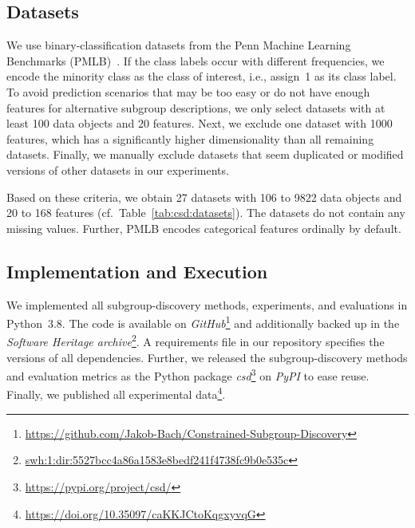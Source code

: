 \documentclass{article}
\theoremstyle{definition}
\begin{document}
\subsection{Datasets}
\label{sec:csd:experimental-design:datasets}

We use binary-classification datasets from the Penn Machine Learning Benchmarks (PMLB)~\cite{olson2017pmlb, romano2021pmlb}.
If the class labels occur with different frequencies, we encode the minority class as the class of interest, i.e., assign~1 as its class label.
To avoid prediction scenarios that may be too easy or do not have enough features for alternative subgroup descriptions, we only select datasets with at least 100 data objects and 20 features.
Next, we exclude one dataset with 1000 features, which has a significantly higher dimensionality than all remaining datasets.
Finally, we manually exclude datasets that seem duplicated or modified versions of other datasets in our experiments.

Based on these criteria, we obtain 27 datasets with 106 to 9822 data objects and 20 to 168 features (cf.~Table~\ref{tab:csd:datasets}).
The datasets do not contain any missing values.
Further, PMLB encodes categorical features ordinally by default.

\subsection{Implementation and Execution}
\label{sec:csd:experimental-design:implementation}

We implemented all subgroup-discovery methods, experiments, and evaluations in Python~3.8.
The code is available on \emph{GitHub}\footnote{\url{https://github.com/Jakob-Bach/Constrained-Subgroup-Discovery}} and additionally backed up in the \emph{Software Heritage archive}\footnote{\href{https://archive.softwareheritage.org/swh:1:dir:5527bcc4a86a1583e8bedf241f4738fc9b0e535c;origin=https://github.com/Jakob-Bach/Constrained-Subgroup-Discovery;visit=swh:1:snp:8f87dcdf0277985d373245e5a23a128efc861153;anchor=swh:1:rev:0c0e4a978c95d881c4c20eecdd5a1ae12ee08ac3}{swh:1:dir:5527bcc4a86a1583e8bedf241f4738fc9b0e535c}}.
A requirements file in our repository specifies the versions of all dependencies.
Further, we released the subgroup-discovery methods and evaluation metrics as the Python package \emph{csd}\footnote{\url{https://pypi.org/project/csd/}} on \emph{PyPI} to ease reuse.
Finally, we published all experimental data\footnote{\url{https://doi.org/10.35097/caKKJCtoKqgxyvqG}}.
\end{document}
